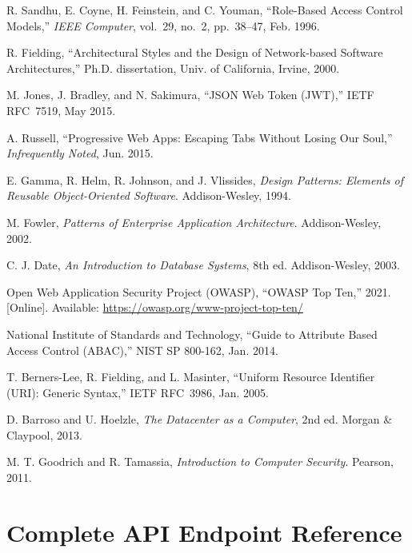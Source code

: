 \documentclass[12pt,a4paper]{report}
\begin{document}
\begin{enumerate}[label={[\arabic*]}]
  \item R. Sandhu, E. Coyne, H. Feinstein, and C. Youman, ``Role-Based Access Control Models,'' \textit{IEEE Computer}, vol.~29, no.~2, pp.~38--47, Feb. 1996.
  \item R. Fielding, ``Architectural Styles and the Design of Network-based Software Architectures,'' Ph.D. dissertation, Univ. of California, Irvine, 2000.
  \item M. Jones, J. Bradley, and N. Sakimura, ``JSON Web Token (JWT),'' IETF RFC~7519, May 2015.
  \item A. Russell, ``Progressive Web Apps: Escaping Tabs Without Losing Our Soul,'' \textit{Infrequently Noted}, Jun. 2015.
  \item E. Gamma, R. Helm, R. Johnson, and J. Vlissides, \textit{Design Patterns: Elements of Reusable Object-Oriented Software}. Addison-Wesley, 1994.
  \item M. Fowler, \textit{Patterns of Enterprise Application Architecture}. Addison-Wesley, 2002.
  \item C. J. Date, \textit{An Introduction to Database Systems}, 8th ed. Addison-Wesley, 2003.
  \item Open Web Application Security Project (OWASP), ``OWASP Top Ten,'' 2021. [Online]. Available: \url{https://owasp.org/www-project-top-ten/}
  \item National Institute of Standards and Technology, ``Guide to Attribute Based Access Control (ABAC),'' NIST SP 800-162, Jan. 2014.
  \item T. Berners-Lee, R. Fielding, and L. Masinter, ``Uniform Resource Identifier (URI): Generic Syntax,'' IETF RFC~3986, Jan. 2005.
  \item D. Barroso and U. Hoelzle, \textit{The Datacenter as a Computer}, 2nd ed. Morgan \& Claypool, 2013.
  \item M. T. Goodrich and R. Tamassia, \textit{Introduction to Computer Security}. Pearson, 2011.
\end{enumerate}

\appendix

\chapter{Complete API Endpoint Reference}
\end{document}
